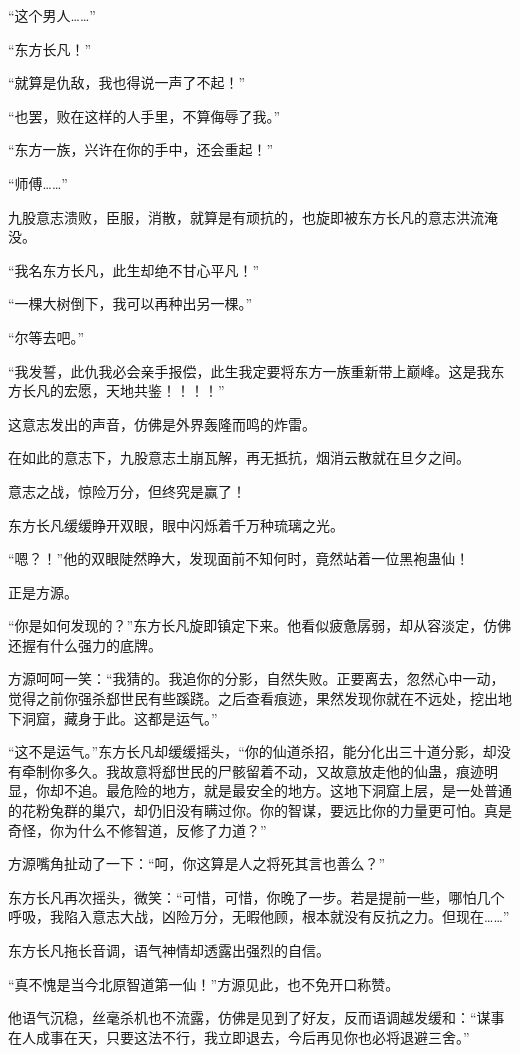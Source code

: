 \begin{this_body}
“这个男人……”

“东方长凡！”

“就算是仇敌，我也得说一声了不起！”

“也罢，败在这样的人手里，不算侮辱了我。”

“东方一族，兴许在你的手中，还会重起！”

“师傅……”

九股意志溃败，臣服，消散，就算是有顽抗的，也旋即被东方长凡的意志洪流淹没。

“我名东方长凡，此生却绝不甘心平凡！”

“一棵大树倒下，我可以再种出另一棵。”

“尔等去吧。”

“我发誓，此仇我必会亲手报偿，此生我定要将东方一族重新带上巅峰。这是我东方长凡的宏愿，天地共鉴！！！！”

这意志发出的声音，仿佛是外界轰隆而鸣的炸雷。

在如此的意志下，九股意志土崩瓦解，再无抵抗，烟消云散就在旦夕之间。

意志之战，惊险万分，但终究是赢了！

东方长凡缓缓睁开双眼，眼中闪烁着千万种琉璃之光。

“嗯？！”他的双眼陡然睁大，发现面前不知何时，竟然站着一位黑袍蛊仙！

正是方源。

“你是如何发现的？”东方长凡旋即镇定下来。他看似疲惫孱弱，却从容淡定，仿佛还握有什么强力的底牌。

方源呵呵一笑：“我猜的。我追你的分影，自然失败。正要离去，忽然心中一动，觉得之前你强杀郄世民有些蹊跷。之后查看痕迹，果然发现你就在不远处，挖出地下洞窟，藏身于此。这都是运气。”

“这不是运气。”东方长凡却缓缓摇头，“你的仙道杀招，能分化出三十道分影，却没有牵制你多久。我故意将郄世民的尸骸留着不动，又故意放走他的仙蛊，痕迹明显，你却不追。最危险的地方，就是最安全的地方。这地下洞窟上层，是一处普通的花粉兔群的巢穴，却仍旧没有瞒过你。你的智谋，要远比你的力量更可怕。真是奇怪，你为什么不修智道，反修了力道？”

方源嘴角扯动了一下：“呵，你这算是人之将死其言也善么？”

东方长凡再次摇头，微笑：“可惜，可惜，你晚了一步。若是提前一些，哪怕几个呼吸，我陷入意志大战，凶险万分，无暇他顾，根本就没有反抗之力。但现在……”

东方长凡拖长音调，语气神情却透露出强烈的自信。

“真不愧是当今北原智道第一仙！”方源见此，也不免开口称赞。

他语气沉稳，丝毫杀机也不流露，仿佛是见到了好友，反而语调越发缓和：“谋事在人成事在天，只要这法不行，我立即退去，今后再见你也必将退避三舍。”


\end{this_body}
